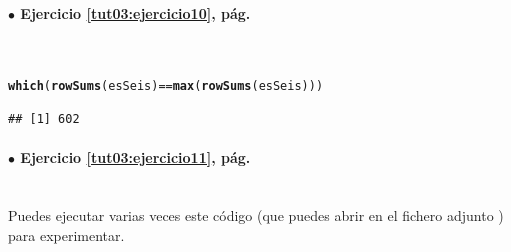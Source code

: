 \documentclass[10pt,a4paper]{article}\usepackage[]{graphicx}\usepackage[]{color}
\makeatletter
\newcommand{\hlopt}[1]{\textcolor[rgb]{0,0,0}{#1}}%
\newcommand{\hlstd}[1]{\textcolor[rgb]{0.345,0.345,0.345}{#1}}%
\newcommand{\hlkwd}[1]{\textcolor[rgb]{0.737,0.353,0.396}{\textbf{#1}}}%
\newenvironment{kframe}{%
 \def\at@end@of@kframe{}%
 \ifinner\ifhmode%
  \def\at@end@of@kframe{\end{minipage}}%
  \begin{minipage}{\columnwidth}%
 \fi\fi%
 \def\FrameCommand##1{\hskip\@totalleftmargin \hskip-\fboxsep
 \colorbox{shadecolor}{##1}\hskip-\fboxsep
     \hskip-\linewidth \hskip-\@totalleftmargin \hskip\columnwidth}%
 \MakeFramed {\advance\hsize-\width
   \@totalleftmargin\z@ \linewidth\hsize
   \@setminipage}}%
 {\par\unskip\endMakeFramed%
 \at@end@of@kframe}
\newenvironment{knitrout}{}{} %
\makeatother
\begin{document}
\paragraph{\bf $\bullet$ Ejercicio \ref{tut03:ejercicio10}, pág. \pageref{tut03:ejercicio10}}
\label{tut03:ejercicio10:sol}\quad\\

\begin{knitrout}
\color{fgcolor}\begin{kframe}
\begin{alltt}
\hlkwd{which}\hlstd{(}\hlkwd{rowSums}\hlstd{(esSeis)} \hlopt{==} \hlkwd{max}\hlstd{(}\hlkwd{rowSums}\hlstd{(esSeis)))}
\end{alltt}
\begin{verbatim}
## [1] 602
\end{verbatim}
\end{kframe}
\end{knitrout}

\paragraph{\bf $\bullet$ Ejercicio \ref{tut03:ejercicio11}, pág. \pageref{tut03:ejercicio11}}
\label{tut03:ejercicio11:sol}\quad\\

Puedes ejecutar varias veces este código (que puedes abrir en el fichero adjunto ) para experimentar.
\end{document}
